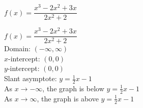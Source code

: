 {$f(x) = \dfrac{x^3-2x^2+3x}{2x^2+2}$}
{$f(x) = \dfrac{x^3-2x^2+3x}{2x^2+2}$\\
Domain: $(-\infty,\infty)$\\
$x$-intercept: $(0,0)$\\
$y$-intercept:  $(0,0)$\\
Slant asymptote: $y = \frac{1}{2}x-1$\\
As $x \rightarrow -\infty$, the graph is below $y = \frac{1}{2}x-1$\\
As $x \rightarrow \infty$, the graph is above $y = \frac{1}{2}x-1$


\begin{center}
\end{center}}